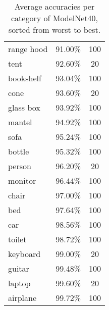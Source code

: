 \begin{table}[]
\begin{tabular}[t]{lcc}
		range hood        & 91.00\%           & 100            \\
		tent              & 92.60\%           & 20             \\
		bookshelf         & 93.04\%           & 100            \\
		cone              & 93.60\%           & 20             \\
		glass box         & 93.92\%           & 100            \\
		mantel            & 94.92\%           & 100            \\
		sofa              & 95.24\%           & 100            \\
		bottle            & 95.32\%           & 100            \\
		person            & 96.20\%           & 20             \\
		monitor           & 96.44\%           & 100            \\
		chair             & 97.00\%           & 100            \\
		bed               & 97.64\%           & 100            \\
		car               & 98.56\%           & 100            \\
		toilet            & 98.72\%           & 100            \\
		keyboard          & 99.00\%           & 20             \\
		guitar            & 99.48\%           & 100            \\
		laptop            & 99.60\%           & 20             \\
		airplane          & 99.72\%           & 100            \\ \hline
	\end{tabular}
	
	
	\caption{Average accuracies per category of ModelNet40, sorted from worst to best.}
	\label{Table:cataccuracies}
\end{table}